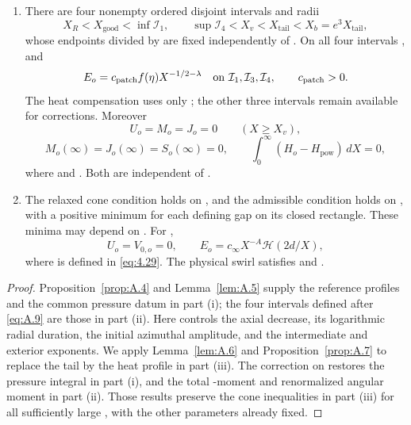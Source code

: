 \begin{lemma}
\begin{enumerate}[label=(\roman*)]
\item There are four nonempty ordered disjoint intervals  and radii
\[
  X_R<X_{\mathrm{good}}<\inf\mathcal{I}_1,\qquad
  \sup\mathcal{I}_4<X_v<X_{\mathrm{tail}}<X_b=e^3X_{\mathrm{tail}},
\]
whose endpoints divided by  are fixed independently of . On all four intervals , and
\[
  E_o=c_{\mathrm{patch}}f(\eta)X^{-1/2-\lambda}\quad\hbox{on }\mathcal{I}_1,\mathcal{I}_3,\mathcal{I}_4,
  \qquad c_{\mathrm{patch}}>0.
\]
The heat compensation uses only ; the other three intervals remain available for corrections. Moreover
\[
  U_o=M_o=J_o=0\qquad(X\geq X_v),
\]
\[
  M_o(\infty)=J_o(\infty)=S_o(\infty)=0,
  \qquad \int_0^\infty(H_o-H_{\mathrm{pow}})\,dX=0,
\]
where  and . Both  are independent of .

\item The relaxed cone condition holds on , and the admissible condition holds on , with a positive minimum for each defining gap on its closed rectangle. These minima may depend on . For ,
\[
  U_o=V_{0,o}=0,\qquad E_o=c_\infty X^{-A}\mathcal{H}(2d/X),
\]
where  is defined in \eqref{eq:4.29}. The physical swirl  satisfies  and .
\end{enumerate}
\end{lemma}
%
\begin{proof}
Proposition~\ref{prop:A.4} and Lemma~\ref{lem:A.5} supply the reference profiles and the common pressure datum in part (i); the four intervals defined after \eqref{eq:A.9} are those in part (ii). Here  controls the axial decrease,  its logarithmic radial duration,  the initial azimuthal amplitude, and  the intermediate and exterior exponents. We apply Lemma~\ref{lem:A.6} and Proposition~\ref{prop:A.7} to replace the tail by the heat profile in part (iii). The correction on  restores the pressure integral in part (i), and the total -moment and renormalized angular moment in part (ii). Those results preserve the cone inequalities in part (iii) for all sufficiently large , with the other parameters already fixed.
\end{proof}

